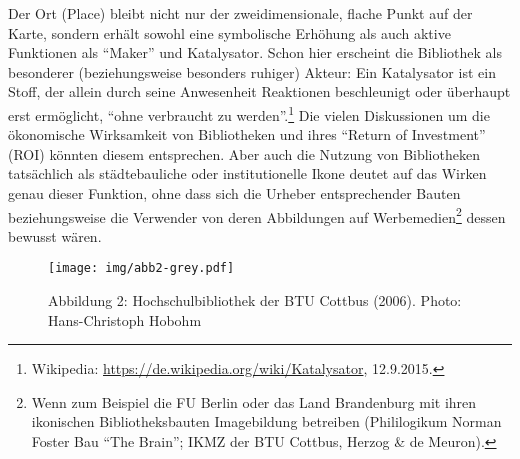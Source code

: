 Der Ort (Place) bleibt nicht nur der zweidimensionale, flache Punkt auf
der Karte, sondern erhält sowohl eine symbolische Erhöhung als auch
aktive Funktionen als \enquote{Maker} und Katalysator. Schon hier
erscheint die Bibliothek als besonderer (beziehungsweise besonders
ruhiger) Akteur: Ein Katalysator ist ein Stoff, der allein durch seine
Anwesenheit Reaktionen beschleunigt oder überhaupt erst ermöglicht,
\enquote{ohne verbraucht zu werden}.\footnote{Wikipedia:
  \url{https://de.wikipedia.org/wiki/Katalysator}, 12.9.2015.} Die
vielen Diskussionen um die ökonomische Wirksamkeit von Bibliotheken und
ihres \enquote{Return of Investment} (ROI) könnten diesem entsprechen.
Aber auch die Nutzung von Bibliotheken tatsächlich als städtebauliche
oder institutionelle Ikone deutet auf das Wirken genau dieser Funktion,
ohne dass sich die Urheber entsprechender Bauten beziehungsweise die
Verwender von deren Abbildungen auf Werbemedien\footnote{Wenn zum
  Beispiel die FU Berlin oder das Land Brandenburg mit ihren ikonischen
  Bibliotheksbauten Imagebildung betreiben (Phililogikum Norman Foster
  Bau \enquote{The Brain}; IKMZ der BTU Cottbus, Herzog \& de Meuron).}
dessen bewusst wären.

\begin{figure}[htbp]
\centering
\texttt{[image: img/abb2-grey.pdf]}
\caption*{Abbildung 2: Hochschulbibliothek der BTU Cottbus (2006). Photo: Hans-Christoph Hobohm}
\end{figure}

